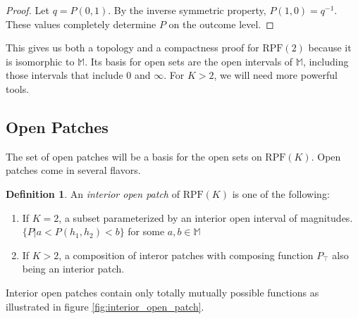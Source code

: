 \documentclass[twoside]{article}
\theoremstyle{plain}%
\theoremstyle{definition}
\newtheorem{definition}{Definition}[section]
\theoremstyle{remark}
\begin{document}
\begin{proof}
Let \(q = P(0, 1)\). By the inverse symmetric property, \(P(1, 0) = q^{-1}\). These values completely determine \(P\) on the outcome level.
\end{proof}

This gives us both a topology and a compactness proof for \(\text{RPF}(2)\) because it is isomorphic to \(\mathbb{M}\). Its basis for open sets are the open intervals of \(\mathbb{M}\), including those intervals that include 0 and \(\infty\). For \(K > 2\), we will need more powerful tools.

\subsection{Open Patches}

The set of open patches will be a basis for the open sets on \(\text{RPF}(K)\). Open patches come in several flavors.

\begin{definition}
An \textit{interior open patch} of \(\text{RPF}(K)\) is one of the following:

\begin{enumerate}
  \item If \(K = 2\), a subset parameterized by an interior open interval of magnitudes. \(\{P | a < P(h_1, h_2) < b\}\) for some \(a, b \in \mathbb{M}\) 
  \item If \(K > 2\), a composition of interor patches with composing function \(P_{\top}\) also being an interior patch.
\end{enumerate}
\end{definition}

Interior open patches contain only totally mutually possible functions as illustrated in figure \ref{fig:interior_open_patch}.
\end{document}
